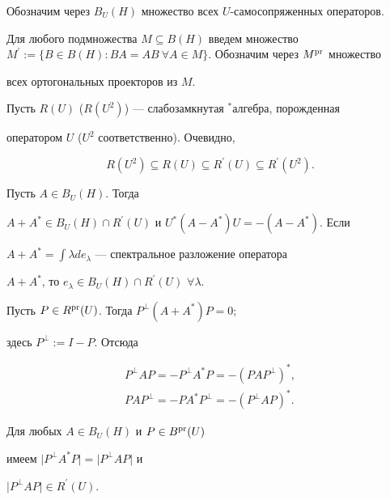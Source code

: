 Обозначим через $B_{U}(H)$ множество всех $U$-самосопряженных операторов.


Для любого подмножества $M\subseteq B(H)$ введем множество $M^{\prime}:=


\{B\in B(H): BA=AB\ \forall A\in M\}$. Обозначим через $M^{\pr}$ множество


всех ортогональных проекторов из $M$.


Пусть $R(U)$ ($R(U^{2})$) --- слабозамкнутая $^{*}$алгебра, порожденная


оператором $U$ ($U^{2}$ соответственно). Очевидно,


$$


R(U^{2})\subseteq R(U)\subseteq R^{\prime}(U)\subseteq R^{\prime}(U^{2}).


$$





Пусть $A\in B_{U}(H)$. Тогда


$A+A^{*}\in B_{U}(H)\cap R^{\prime}(U)$ и $U^{*}(A-A^{*})U=-(A-A^{*})$. Если


$A+A^{*}=\int\lambda de_{\lambda}$ --- спектральное разложение оператора


$A+A^{*}$, то $e_{\lambda}\in B_{U}(H)\cap R^{\prime}(U)$ $\forall\lambda$.


Пусть $P\in R^{\operatorname{pr}}(U)$. Тогда $P^{\perp}(A+A^{*})P=0$;


здесь $P^{\perp}:=I-P$. Отсюда


\begin{gather}


P^{\perp}AP=-P^{\perp}A^{*}P=-(PAP^{\perp})^{*}, \\


PAP^{\perp}=-PA^{*}P^{\perp}=-(P^{\perp}AP)^{*}.


\end{gather}





\begin{prop}


Для любых $A\in B_{U}(H)$ и $P\in B^{\operatorname{pr}}(U)$


имеем $\vert P^{\perp}A^{*}P\vert =\vert P^{\perp}AP\vert$ и


$\vert P^{\perp}AP\vert\in R^{\prime}(U)$.


\end{prop}





